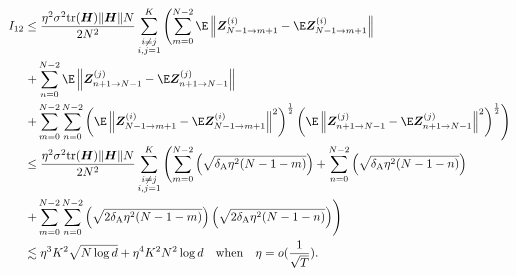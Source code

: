 \begin{align*}           
    I_{12}&\leq \frac{\eta^2\sigma^2\text{tr}(\mH)\|\mH\|N}{2N^2}\sum_{\substack{i\neq j \\i,j=1}}^K\left(\sum_{m=0}^{N-2}\E\left\|\mZ_{N-1 \to m+1}^{(i)}-\E\mZ_{N-1 \to m+1}^{(i)}\right\|\right.\\
    &\left.+\sum_{n=0}^{N-2}\E\left\|\mZ_{n+1 \to N-1}^{(j)}-\E\mZ_{n+1 \to N-1}^{(j)}\right\|\right. \\
    &\left.+\sum_{m=0}^{N-2}\sum_{n=0}^{N-2}\left(\E\left\|\mZ_{N-1 \to m+1}^{(i)}-\E\mZ_{N-1 \to m+1}^{(i)}\right\|^2\right)^{\frac{1}{2}}\left(\E\left\|\mZ_{n+1 \to N-1}^{(j)}-\E\mZ_{n+1 \to N-1}^{(j)}\right\|^2\right)^{\frac{1}{2}}\right) \\
    &\leq \frac{\eta^2\sigma^2\text{tr}(\mH)\|\mH\|N}{2N^2}\sum_{\substack{i\neq j \\i,j=1}}^K\left(\sum_{m=0}^{N-2}\left(\sqrt{\deltaA\eta^2(N-1-m)}\right)+
    \sum_{n=0}^{N-2}\left(\sqrt{\deltaA\eta^2(N-1-n)}\right)\right. \\
    &\left.+\sum_{m=0}^{N-2}\sum_{n=0}^{N-2}\left(\sqrt{2\deltaA\eta^2(N-1-m)}\right)\left(\sqrt{2\deltaA\eta^2(N-1-n)}\right)\right) \\ 
    &\lesssim \eta^3K^2\sqrt{N\log d}+\eta^4 K^2N^2\log d ~~~\text{when} ~~~\eta = o(\frac{1}{\sqrt{T}}).
\end{align*}
